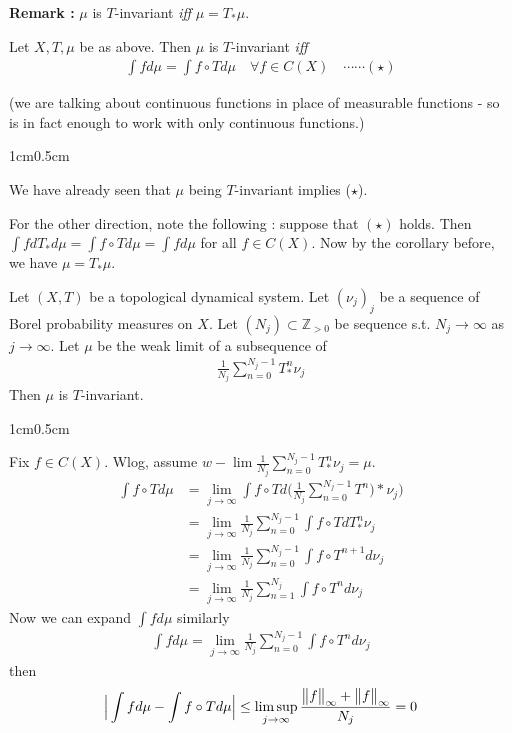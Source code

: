 \documentclass[12pt,a4paper]{report}
\newenvironment{proof}
{\begin{changemargin}{1cm}{0.5cm} 
	}%
	{\end{changemargin}
}
\begin{document}
\bull \textbf{Remark :} $\mu$ is $T$-invariant \emph{iff} $\mu = T_* \mu$.
\s

\lem Let $X, T, \mu$ be as above. Then $\mu$ is $T$-invariant \emph{iff}
\begin{align*}
\int f d\mu = \int f\circ T d\mu \quad \forall f \in C(X) \quad \cdots \cdots (\star)
\end{align*}

(we are talking about continuous functions in place of measurable functions - so is in fact enough to work with only continuous functions.)
\begin{proof}
\pf We have already seen that $\mu$ being $T$-invariant implies ($\star$).

For the other direction, note the following : suppose that $(\star)$ holds. Then $\int f dT_* d\mu = \int f\circ T d\mu = \int fd\mu$ for all $f\in C(X)$. Now by the corollary before, we have $\mu = T_* \mu$.   

\eop
\end{proof}
\s

\thm Let $(X,T)$ be a topological dynamical system. Let $(\nu_j)_j$ be a sequence of Borel probability measures on $X$. Let $(N_j) \subset \mathbb{Z}_{>0}$ be sequence s.t. $N_j \rightarrow \infty$ as $j\rightarrow \infty$. Let $\mu$ be the weak limit of a subsequence of
\begin{align*}
\frac{1}{N_j} \sum_{n=0}^{N_j -1} T^n_* \nu_j 
\end{align*}
Then $\mu$ is $T$-invariant.
\begin{proof}
\pf Fix $f\in C(X)$. Wlog, assume $w-\lim \frac{1}{N_j} \sum_{n=0}^{N_j -1} T^n_* \nu_j = \mu$.
\begin{align*}
\int f\circ T d\mu &= \lim_{j\rightarrow \infty} \int f\circ T d\Big( \frac{1}{N_j} \sum_{n=0}^{N_j-1} T^n)* \nu_j \Big)  \\
& = \lim_{j\rightarrow \infty} \frac{1}{N_j} \sum_{n=0}^{N_j-1} \int f\circ T dT^n_* \nu_j \\
& = \lim_{j\rightarrow \infty}\frac{1}{N_j} \sum_{n=0}^{N_j-1} \int f\circ T^{n+1} d\nu_j \\
& = \lim_{j\rightarrow \infty}\frac{1}{N_j} \sum_{n=1}^{N_j} \int f\circ T^{n} d\nu_j
\end{align*}
Now we can expand $\int fd\mu$ similarly
\begin{align*}
\int fd\mu = \lim_{j\rightarrow \infty} \frac{1}{N_j} \sum_{n=0}^{N_j -1} \int f\circ T^n d\nu_j
\end{align*}
then 
\begin{align*}
\Big| \int fd\mu - \int f\circ T d\mu \Big| \leq \limsup_{j\rightarrow \infty} \frac{\bigl\lVert f\bigr\rVert_{\infty} + \bigl\lVert f\bigr\rVert_{\infty}}{N_j}=0
\end{align*}
\end{proof}
\end{document}
